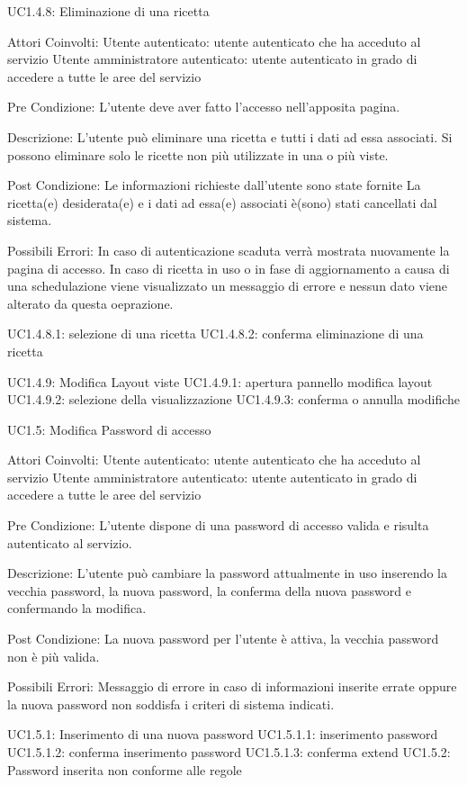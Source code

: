 UC1.4.8: Eliminazione di una ricetta

Attori Coinvolti:
Utente autenticato: utente autenticato che ha acceduto al servizio
Utente amministratore autenticato: utente autenticato in grado di accedere a tutte le aree del servizio

Pre Condizione:
        L’utente deve aver fatto l’accesso nell’apposita pagina.

Descrizione:
L’utente può eliminare una ricetta e tutti i dati ad essa associati.
Si possono eliminare solo le ricette non più utilizzate in una o più viste.    

Post Condizione:
        Le informazioni richieste dall’utente sono state fornite
La ricetta(e) desiderata(e) e i dati ad essa(e) associati è(sono) stati cancellati dal sistema.

Possibili Errori:
In caso di autenticazione scaduta verrà mostrata nuovamente la pagina di accesso.
In caso di ricetta in uso o in fase di aggiornamento a causa di una schedulazione viene visualizzato un messaggio di errore e nessun dato viene alterato da questa oeprazione.


UC1.4.8.1: selezione di una ricetta
UC1.4.8.2: conferma eliminazione di una ricetta

UC1.4.9: Modifica Layout viste 
UC1.4.9.1: apertura pannello modifica layout
UC1.4.9.2: selezione della visualizzazione
UC1.4.9.3: conferma o annulla modifiche

UC1.5: Modifica Password di accesso

Attori Coinvolti:
Utente autenticato: utente autenticato che ha acceduto al servizio
Utente amministratore autenticato: utente autenticato in grado di accedere a tutte le aree del servizio

Pre Condizione:
    L’utente dispone di una password di accesso valida e risulta autenticato al servizio.

Descrizione:
    L’utente può cambiare la password attualmente in uso inserendo la vecchia password, la nuova password, la conferma della nuova password e confermando la modifica.

Post Condizione:
    La nuova password per l’utente è attiva, la vecchia password non è più valida.

Possibili Errori:
Messaggio di errore in caso di informazioni inserite errate oppure la nuova password non soddisfa i criteri di sistema indicati.

UC1.5.1: Inserimento di una nuova password
UC1.5.1.1: inserimento password
UC1.5.1.2: conferma inserimento password 
UC1.5.1.3: conferma
extend
UC1.5.2: Password inserita non conforme alle regole

